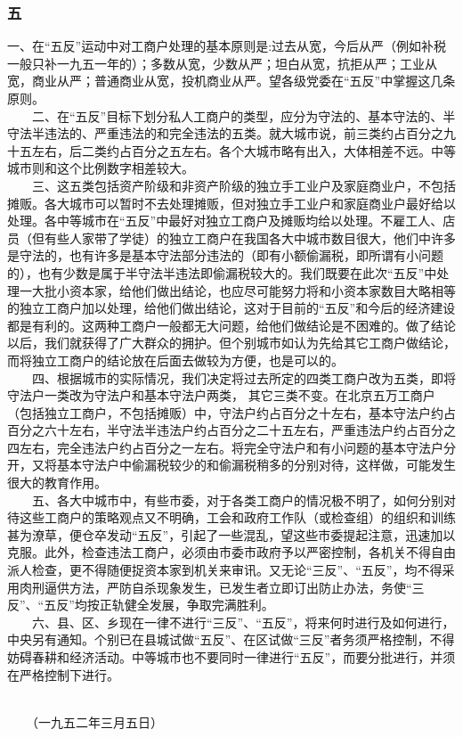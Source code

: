 \documentclass[cn,11pt,chinese]{elegantbook}
\def\myformat#1{\hfil\hfil #1}
\begin{document}
\subsubsection*{\myformat{五}}
一、在“五反”运动中对工商户处理的基本原则是:过去从宽，今后从严（例如补税一般只补一九五一年的）；多数从宽，少数从严；坦白从宽，抗拒从严；工业从宽，商业从严；普通商业从宽，投机商业从严。望各级党委在“五反”中掌握这几条原则。\\
　　二、在“五反”目标下划分私人工商户的类型，应分为守法的、基本守法的、半守法半违法的、严重违法的和完全违法的五类。就大城市说，前三类约占百分之九十五左右，后二类约占百分之五左右。各个大城市略有出入，大体相差不远。中等城市则和这个比例数字相差较大。\\
　　三、这五类包括资产阶级和非资产阶级的独立手工业户及家庭商业户，不包括摊贩。各大城市可以暂时不去处理摊贩，但对独立手工业户和家庭商业户最好给以处理。各中等城市在“五反”中最好对独立工商户及摊贩均给以处理。不雇工人、店员（但有些人家带了学徒）的独立工商户在我国各大中城市数目很大，他们中许多是守法的，也有许多是基本守法部分违法的（即有小额偷漏税，即所谓有小问题的），也有少数是属于半守法半违法即偷漏税较大的。我们既要在此次“五反”中处理一大批小资本家，给他们做出结论，也应尽可能努力将和小资本家数目大略相等的独立工商户加以处理，给他们做出结论，这对于目前的“五反”和今后的经济建设都是有利的。这两种工商户一般都无大问题，给他们做结论是不困难的。做了结论以后，我们就获得了广大群众的拥护。但个别城市如认为先给其它工商户做结论，而将独立工商户的结论放在后面去做较为方便，也是可以的。\\
　　四、根据城市的实际情况，我们决定将过去所定的四类工商户改为五类，即将守法户一类改为守法户和基本守法户两类， 其它三类不变。在北京五万工商户（包括独立工商户，不包括摊贩）中，守法户约占百分之十左右，基本守法户约占百分之六十左右，半守法半违法户约占百分之二十五左右，严重违法户约占百分之四左右，完全违法户约占百分之一左右。将完全守法户和有小问题的基本守法户分开，又将基本守法户中偷漏税较少的和偷漏税稍多的分别对待，这样做，可能发生很大的教育作用。\\
　　五、各大中城市中，有些市委，对于各类工商户的情况极不明了，如何分别对待这些工商户的策略观点又不明确，工会和政府工作队（或检查组）的组织和训练甚为潦草，便仓卒发动“五反”，引起了一些混乱，望这些市委提起注意，迅速加以克服。此外，检查违法工商户，必须由市委市政府予以严密控制，各机关不得自由派人检查，更不得随便捉资本家到机关来审讯。又无论“三反”、“五反”，均不得采用肉刑逼供方法，严防自杀现象发生，已发生者立即订出防止办法，务使“三反”、“五反”均按正轨健全发展，争取完满胜利。\\
　　六、县、区、乡现在一律不进行“三反”、“五反”，将来何时进行及如何进行，中央另有通知。个别已在县城试做“五反”、在区试做“三反”者务须严格控制，不得妨碍春耕和经济活动。中等城市也不要同时一律进行“五反”，而要分批进行，并须在严格控制下进行。\\
　　\begin{flushright}
　　（一九五二年三月五日）
　　\end{flushright}
\end{document}
